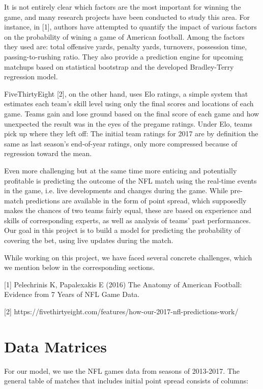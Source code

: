 \documentclass[runningheads]{llncs}
\begin{document}
It is not entirely clear which factors are the most important for winning the game, and many research projects have been conducted to study this area. For instance, in [1], authors have attempted to quantify the impact of various factors on the probability of wining a game of American football. Among the factors they used are: total offensive yards, penalty yards, turnovers, possession time, passing-to-rushing ratio. They also provide a prediction engine for upcoming matchups based on statistical bootstrap and the developed Bradley-Terry regression model.

FiveThirtyEight [2], on the other hand, uses Elo ratings, a simple system that estimates each team’s skill level using only the final scores and locations of each game. Teams gain and lose ground based on the final score of each game and how unexpected the result was in the eyes of the pregame ratings. Under Elo, teams pick up where they left off: The initial team ratings for 2017 are by definition the same as last season’s end-of-year ratings, only more compressed because of regression toward the mean. 

Even more challenging but at the same time more enticing and potentially profitable is predicting the outcome of the NFL match using the real-time events in the game, i.e. live developments and changes during the game. While pre-match predictions are available in the form of point spread, which supposedly makes the chances of two teams fairly equal, these are based on experience and skills of corresponding experts, as well as analysis of teams' past performances. Our goal in this project is to build a model for predicting the probability of covering the bet, using live updates during the match.

While working on this project, we have faced several concrete challenges, which we mention below in the corresponding sections.

[1] Pelechrinis K, Papalexakis E (2016) The Anatomy of American Football: Evidence from 7 Years of NFL Game Data.

[2] https://fivethirtyeight.com/features/how-our-2017-nfl-predictions-work/ 


\section{Data Matrices}

For our model, we use the NFL games data from seasons of 2013-2017. The general table of matches that includes initial point spread consists of columns:
\end{document}
